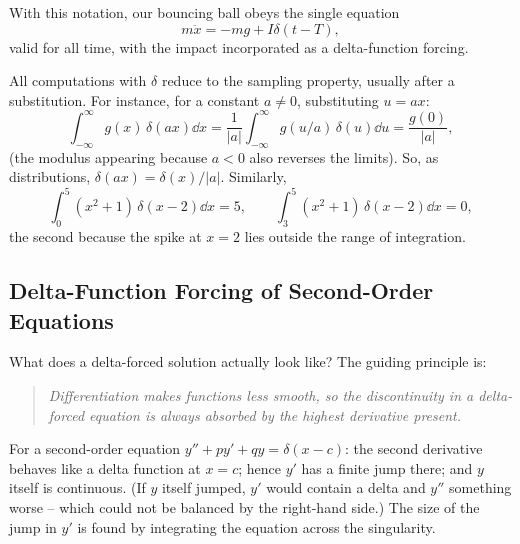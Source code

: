 \documentclass[a4paper]{scrartcl}
\begin{document}
With this notation, our bouncing ball obeys the single equation
$$
m \ddot x = -mg + I \delta(t - T),
$$
valid for all time, with the impact incorporated as a delta-function forcing.

\begin{example}
	All computations with $\delta$ reduce to the sampling property, usually after a substitution. For instance, for a constant $a \neq 0$, substituting $u = ax$:
	$$
	\int_{-\infty}^{\infty} g(x) \, \delta(ax) \dd x = \frac{1}{|a|}\int_{-\infty}^\infty g(u/a) \, \delta(u) \dd u = \frac{g(0)}{|a|},
	$$
	(the modulus appearing because $a < 0$ also reverses the limits). So, as distributions, $\delta(ax) = \delta(x)/|a|$. Similarly,
	$$
	\int_0^5 (x^2 + 1)\,\delta(x - 2) \dd x = 5, \qquad \int_3^5 (x^2 + 1)\, \delta(x - 2)\dd x = 0,
	$$
	the second because the spike at $x = 2$ lies outside the range of integration.
\end{example}

\subsection{Delta-Function Forcing of Second-Order Equations}

What does a delta-forced solution actually look like? The guiding principle is:
\begin{quote}
	\emph{Differentiation makes functions less smooth, so the discontinuity in a delta-forced equation is always absorbed by the highest derivative present.}
\end{quote}
For a second-order equation $y'' + p y' + q y = \delta(x - c)$: the second derivative behaves like a delta function at $x = c$; hence $y'$ has a finite jump there; and $y$ itself is continuous. (If $y$ itself jumped, $y'$ would contain a delta and $y''$ something worse -- which could not be balanced by the right-hand side.) The size of the jump in $y'$ is found by integrating the equation across the singularity.
\end{document}
